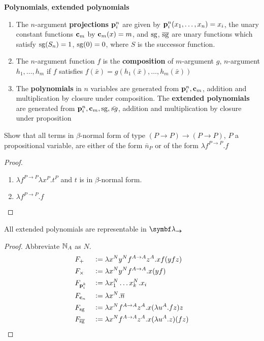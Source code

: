 \documentclass[11pt]{article}
\begin{document}
\begin{definition}[]
\textbf{Polynomials}, \textbf{extended polynomials}
\begin{enumerate}
\item The \(n\)-argument \textbf{projections} \(\operatorname{\textbf{p}}_i^n\) are given by
\(\operatorname{\textbf{p}}_i^n(x_1,\dots,x_n)=x_i\), the unary constant functions \(\operatorname{\textbf{c}}_m\) by
\(\operatorname{\textbf{c}}_m(x)=m\), and \(\operatorname{sg}\), \(\overline{\operatorname{sg}}\) are unary functions which satisfy
\(\operatorname{sg}(S_n)=1\), \(\operatorname{sg}(0)=0\), where \(S\) is the successor function.
\item The \(n\)-argument function \(f\) is the \textbf{composition} of \(m\)-argument \(g\),
\(n\)-argument \(h_1,\dots,h_m\) if \(f\) satisfies
\(f(\bar{x})=g(h_1(\bar{x}),\dots,h_m(\bar{x}))\)
\item The \textbf{polynomials} in \(n\) variables are generated from \(\operatorname{\textbf{p}}_i^n,\operatorname{\textbf{c}}_m\),
addition and multiplication by closure under composition. The \textbf{extended
polynomials} are generated from \(\operatorname{\textbf{p}}_i^n,\operatorname{\textbf{c}}_m,\operatorname{sg},\bar{sg}\), addition and
multiplication by closure under proposition
\end{enumerate}
\end{definition}

\begin{exercise}
Show that all terms in \(\beta\)-normal form of type \((P\to P)\to(P\to P)\), \(P\) a
propositional variable, are either of the form \(\bar{n}_P\) or of the form
\(\lambda f^{P\to P}.f\)
\end{exercise}
\begin{proof}
\begin{enumerate}
\item \(\lambda f^{P\to P}\lambda x^P.t^P\) and \(t\) is in \(\beta\)-normal form.
\item \(\lambda f^{P\to P}.f\)
\end{enumerate}
\end{proof}

\begin{theorem}[]
All extended polynomials are representable in \(\blambda_{\bto}\)
\end{theorem}
\begin{proof}
Abbreviate \(\mathbb{N}_A\) as \(N\).
\begin{alignat*}{2}
&F_+&&:=\lambda x^Ny^Nf^{A\to A}z^A.xf(yfz)\\
&F_\times&&:=\lambda x^Ny^Nf^{A\to A}.x(yf)\\
&F_{\operatorname{\textbf{p}}_i^k}&&:=\lambda x_1^N\dots x_k^N.x_i\\
&F_{\operatorname{\textbf{c}}_n}&&:=\lambda x^N.\overline{n}\\
&F_{\operatorname{sg}}&&:=\lambda x^Nf^{A\to A}z^A.x(\lambda u^A.fz)z\\
&F_{\overline{\operatorname{sg}}}&&:=\lambda x^Nf^{A\to A}z^A.x(\lambda u^A.z)(fz)
\end{alignat*}
\end{proof}
\end{document}
